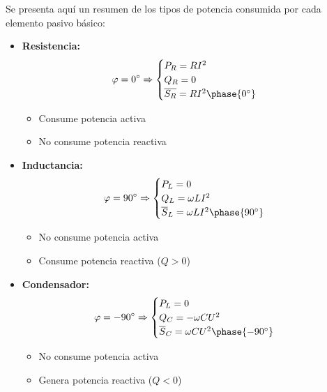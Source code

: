         Se presenta aquí un resumen de los tipos de potencia consumida
        por cada elemento pasivo básico:
        \begin{itemize}
        \item \textbf{Resistencia:}
          \begin{equation*}
            \varphi = 0^\circ \Rightarrow 
            \begin{cases}
              P_R = R I^2\\
              Q_R = 0\\
              \overline{S_R} = R I^2\phase{0^\circ}
            \end{cases}
          \end{equation*}
		
		
		
          \begin{itemize}
          \item Consume potencia activa
          \item No consume potencia reactiva
          \end{itemize}
		
        \item \textbf{Inductancia:}
          \begin{equation*}
            \varphi = 90^\circ \Rightarrow 
            \begin{cases}
              P_L = 0\\
              Q_L = \omega L I^2\\
              \overline{S}_L = \omega L I^2 \phase{90^\circ}
            \end{cases}
          \end{equation*}
		
		
          \begin{itemize}
          \item No consume potencia activa
          \item Consume potencia reactiva ($Q > 0$)
          \end{itemize}
		
        \item \textbf{Condensador:}
          \begin{equation*}
            \varphi = - 90^\circ \Rightarrow 
            \begin{cases}
              P_L = 0\\
              Q_C = - \omega C U^2\\
              \overline{S}_C = \omega C U^2 \phase{- 90^\circ}
            \end{cases}   
          \end{equation*}
		
		
          \begin{itemize}
          \item No consume potencia activa
          \item Genera potencia reactiva ($Q < 0$)
          \end{itemize}
		
		
        \end{itemize}
	
